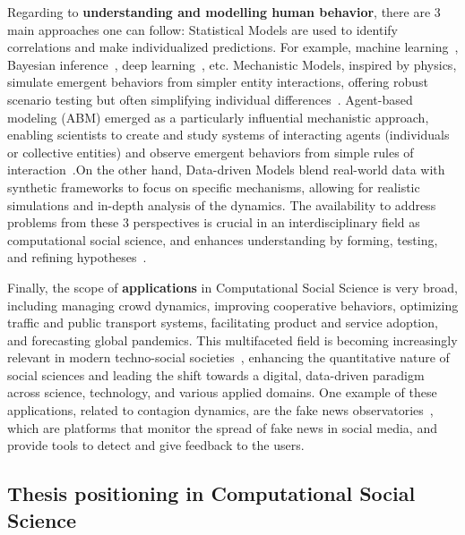Regarding to \textbf{understanding and modelling human behavior}, there are 3 main approaches one can follow: Statistical Models are used to identify correlations and make individualized predictions. For example, machine learning~\cite{murphy-2012}, Bayesian inference~\cite{gelman1995bayesian}, deep learning~\cite{goodfellow-2016}, etc. Mechanistic Models, inspired by physics, simulate emergent behaviors from simpler entity interactions, offering robust scenario testing but often simplifying individual differences~\cite{axelrod2006agent}. Agent-based modeling (ABM) emerged as a particularly influential mechanistic approach, enabling scientists to create and study systems of interacting agents (individuals or collective entities) and observe emergent behaviors from simple rules of interaction~\cite{epstein1999agent}.On the other hand, Data-driven Models blend real-world data with synthetic frameworks to focus on specific mechanisms, allowing for realistic simulations and in-depth analysis of the dynamics. The availability to address problems from these 3 perspectives is crucial in an interdisciplinary field as computational social science, and enhances understanding by forming, testing, and refining hypotheses~\cite{watts2004new}.

Finally, the scope of \textbf{applications} in Computational Social Science is very broad, including managing crowd dynamics, improving cooperative behaviors, optimizing traffic and public transport systems, facilitating product and service adoption, and forecasting global pandemics. This multifaceted field is becoming increasingly relevant in modern techno-social societies~\cite{vespignani2009predicting}, enhancing the quantitative nature of social sciences and leading the shift towards a digital, data-driven paradigm across science, technology, and various applied domains. One example of these applications, related to contagion dynamics, are the fake news observatories~\cite{Polis-observatory, EDMO-observatory, committed-observatory-2023}, which are platforms that monitor the spread of fake news in social media, and provide tools to detect and give feedback to the users.

\subsection{Thesis positioning in Computational Social Science\label{subsec:Thesis positioning in Computational Social Science}}

